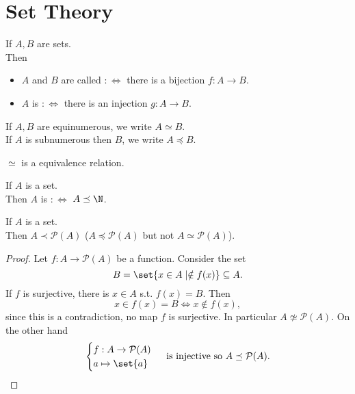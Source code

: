 
\chapter{Set Theory}
\begin{definition}
    If $A,B$ are sets.\\
    Then 
    \begin{itemize}
        \item $A$ and $B$ are called  $:\iff$ there is a bijection $f:A \to B$.
        \item $A$ is  $:\iff$ there is an injection $g:A \to B$.
    \end{itemize}
\end{definition}

\begin{notation}
    If $A,B$ are equinumerous, we write $A \simeq B$.\\
    If $A$ is subnumerous then $B$, we write $A \preceq B$.
\end{notation}

\begin{remark}
    $\simeq$ is a equivalence relation.
\end{remark}

\begin{definition}
    If $A$ is a set.\\
    Then $A$ is  $:\iff$ $A \preceq \N$.
\end{definition}

\begin{theorem}[Cantor]
    If $A$ is a set.\\
    Then $A \prec \mathcal{P}(A)$ ($A \preceq \mathcal{P}(A)$ but not $A \simeq \mathcal{P}(A)$).
\end{theorem}
\begin{proof}
    Let $f: A \to \mathcal{P}(A)$ be a function. Consider the set
    $$ B = \set{x \in A \mid \notin f(x)} \subseteq A.$$
    If $f$ is surjective, there is $x \in A$ s.t. $f(x) = B$.
    Then 
    $$ x \in f(x) = B \iff x \notin f(x), $$
    since this is a contradiction, no map $f$ is surjective. In particular $A \not \simeq \mathcal{P}(A)$.
    On the other hand
    $$\begin{cases}
        f: A \to \mathcal{P}(A)\\
        a \mapsto \set{a}
    \end{cases} \text{ is injective so } A \preceq \mathcal{P}(A).$$
\end{proof}

